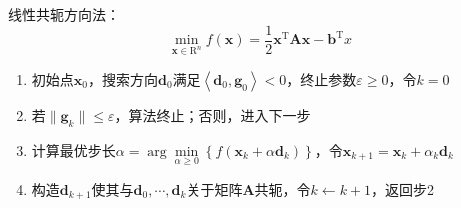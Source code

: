 \begin{note}
    线性共轭方向法：
    \[
    \min\limits_{\boldsymbol{x}\in\mathrm{R}^n} f(\boldsymbol{x}) = \dfrac{1}{2}\boldsymbol{x}^{\mathrm{T}}\boldsymbol{Ax}-\boldsymbol{b}^{\mathrm{T}}x
    \]
    \begin{enumerate}
        \item 初始点$\boldsymbol{x}_0$，搜索方向$\boldsymbol{d}_0$满足$\left< \boldsymbol{d}_0,\boldsymbol{g}_0 \right><0$，终止参数$\varepsilon\geqslant 0$，令$k=0$
        \item 若$\|\boldsymbol{g}_k\|\leqslant \varepsilon$，算法终止；否则，进入下一步
        \item 计算最优步长$\alpha = \arg\min\limits_{\alpha\geqslant 0}\left\{ f(\boldsymbol{x}_k+\alpha \boldsymbol{d}_{k}) \right\}$，令$\boldsymbol{x}_{k+1} = \boldsymbol{x}_k+\alpha_k\boldsymbol{d}_k$
        \item 构造$\boldsymbol{d}_{k+1}$使其与$\boldsymbol{d}_0,\cdots,\boldsymbol{d}_k$关于矩阵$\boldsymbol{A}$共轭，令$k \gets k+1$，返回步2
    \end{enumerate}
\end{note}

